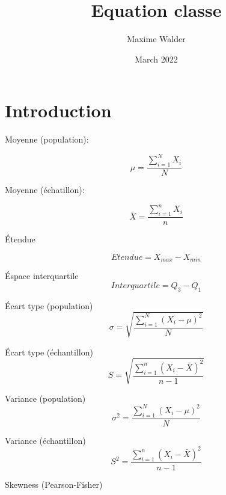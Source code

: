 \documentclass{article}
\title{Equation classe}
\author{Maxime Walder}
\date{March 2022}
\begin{document}
\maketitle

\section{Introduction}

\bigskip

Moyenne (population):\par
\begin{equation}
    \mu = \frac{\sum_{i=1}^{N} X_i}{N}
\end{equation}

Moyenne (échatillon): \par


\begin{equation}
    \bar{X} = \frac{\sum_{i=1}^{n} X_i}{n}
\end{equation}

\bigskip

Étendue

\begin{equation}
    Etendue = X_{max} - X_{min}
\end{equation}

\bigskip


Éspace interquartile
\begin{equation}
    Interquartile = Q_3 - Q_1
\end{equation}


\bigskip


Écart type (population)
\begin{equation}
    \sigma = \sqrt{\frac{\sum_{i=1}^{N} (X_i - \mu)^2}{N}}
\end{equation}


Écart type (échantillon)
\begin{equation}
    S = \sqrt{\frac{\sum_{i=1}^{n} (X_i - \bar{X})^2}{n-1}}
\end{equation}


Variance (population)
\begin{equation}
    \sigma^2 = \frac{\sum_{i=1}^{N} (X_i - \mu)^2}{N}
\end{equation}


Variance (échantillon)
\begin{equation}
    S^2 = \frac{\sum_{i=1}^{n} (X_i - \bar{X})^2}{n-1}
\end{equation}

Skewness (Pearson-Fisher)
\end{document}
